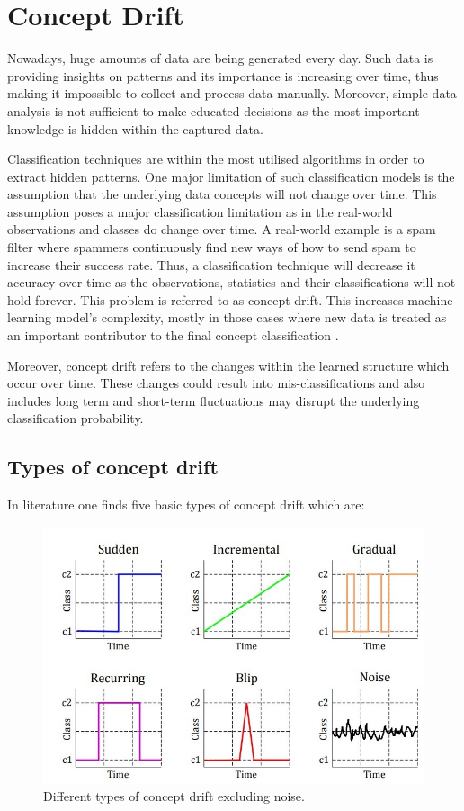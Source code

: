 \chapter[Concept Drift]{Concept Drift}
\label{ch:concept-drift}

   Nowadays, huge amounts of data are being generated every day. Such data is providing insights on patterns and its importance is increasing over time, thus making it impossible to collect and process data manually. Moreover, simple data analysis is not sufficient to make educated decisions as the most important knowledge is hidden within the captured data.
   
Classification techniques are within the most utilised algorithms in order to extract hidden patterns. One major limitation of such classification models is the assumption that the underlying data concepts will not change over time. This assumption poses a major classification limitation as in the real-world observations and classes do change over time.  A real-world example is a spam filter where spammers continuously find new ways of how to send spam to increase their success rate.  Thus, a classification technique will decrease it accuracy over time as the observations, statistics and their classifications will not hold forever. This problem is referred to as concept drift. This increases machine learning model’s complexity, mostly in those cases where new data is treated as an important contributor to the final concept classification \citep{Bishop:2006:PRM:1162264} \citep{Tsymbal04theproblem}. 

Moreover, concept drift refers to the changes within the learned structure which occur over time. These changes could result into mis-classifications and also includes long term and short-term fluctuations may disrupt the underlying classification probability.

\section{Types of concept drift}
In literature one finds five basic types of concept drift which are:

	\begin{figure}[hbt!]
	\centering
  		\includegraphics[width=0.88\linewidth]{graphics/concept_drift/concept_drift.jpg}
  		\caption{Different types of concept drift excluding noise. \citep{GomezLosada2017}}
  		\label{fig:concept-drift-types }
	\end{figure}
	
